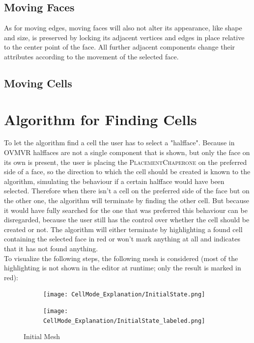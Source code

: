 \documentclass{report}
\begin{document}
		\subsection{Moving Faces}
		\startsubsection
			As for moving edges, moving faces will also not alter its appearance, like shape and size, is preserved by locking its adjacent vertices and edges in place relative to the center point of the face. All further adjacent components change their attributes according to the movement of the selected face.
		\closesection
		\subsection{Moving Cells}
		\startsubsection
		\closesection
	\closesection
		
	\section{Algorithm for Finding Cells}
	\startsection
		To let the algorithm find a cell the user has to select a "halfface". Because in OVMVR halffaces are not a single component that is shown, but only the face on its own is present, the user is placing the \textsc{PlacementChaperone} on the preferred side of a face, so the direction to which the cell should be created is known to the algorithm, simulating the behaviour if a certain halfface would have been selected. Therefore when there isn't a cell on the preferred side of the face but on the other one, the algorithm will terminate by finding the other cell. But because it would have fully searched for the one that was preferred this behaviour can be disregarded, because the user still has the control over whether the cell should be created or not. The algorithm will either terminate by highlighting a found cell containing the selected face in red or won't mark anything at all and indicates that it has not found anything. \\
		To visualize the following steps, the following mesh is considered (most of the highlighting is not shown in the editor at runtime; only the result is marked in red):
		\begin{figure}[H]
			\centering
			\begin{subfigure}[H]{2.5in}
				\centering
				\texttt{[image: CellMode\_Explanation/InitialState.png]}
				\label{pic:pic5.1.a}
			\end{subfigure}
			\quad
			\begin{subfigure}[H]{2.5in}
				\centering
				\texttt{[image: CellMode\_Explanation/InitialState\_labeled.png]}
				\label{pic:pic5.1.b}
			\end{subfigure}
			\caption{Initial Mesh}
			\label{pic:pic5.1}
		\end{figure}
\end{document}
